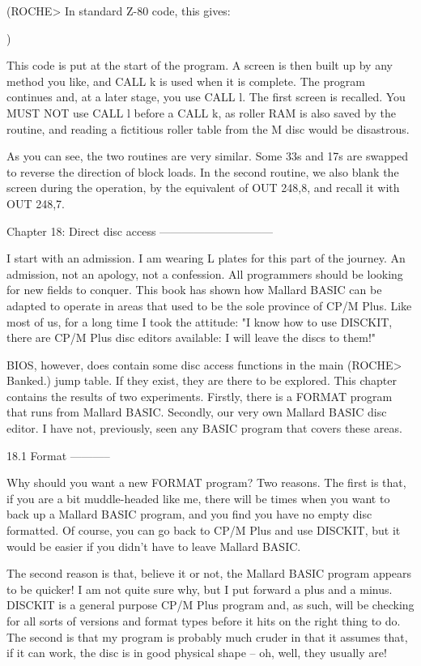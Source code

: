 (ROCHE> In standard Z-80 code, this gives:

$$$$
)

This code is put at the start of the program. A screen is then built up by any 
method you like, and CALL k is used when it is complete. The program continues 
and, at a later stage, you use CALL l. The first screen is recalled. You  MUST 
NOT  use CALL l before a CALL k, as roller RAM is also saved by  the  routine, 
and reading a fictitious roller table from the M disc would be disastrous.

As  you  can  see, the two routines are very similar. Some  33s  and  17s  are 
swapped  to  reverse the direction of block loads. In the second  routine,  we 
also  blank the screen during the operation, by the equivalent of  OUT  248,8, 
and recall it with OUT 248,7.


Chapter 18: Direct disc access
------------------------------

I start with an admission. I am wearing L plates for this part of the journey. 
An  admission,  not an apology, not a confession. All  programmers  should  be 
looking  for new fields to conquer. This book has shown how Mallard BASIC  can 
be adapted to operate in areas that used to be the sole province of CP/M Plus. 
Like  most  of  us, for a long time I took the attitude: "I know  how  to  use 
DISCKIT, there are CP/M Plus disc editors available: I will leave the discs to 
them!"

BIOS,  however,  does contain some disc access functions in the  main  (ROCHE> 
Banked.)  jump  table.  If they exist, they are there  to  be  explored.  This 
chapter  contains the results of two experiments. Firstly, there is  a  FORMAT 
program  that  runs from Mallard BASIC. Secondly, our very own  Mallard  BASIC 
disc editor. I have not, previously, seen any BASIC program that covers  these 
areas.


18.1 Format
-----------

Why  should you want a new FORMAT program? Two reasons. The first is that,  if 
you are a bit muddle-headed like me, there will be times when you want to back 
up a Mallard BASIC program, and you find you have no empty disc formatted.  Of 
course,  you can go back to CP/M Plus and use DISCKIT, but it would be  easier 
if you didn't have to leave Mallard BASIC.

The  second  reason  is that, believe it or not,  the  Mallard  BASIC  program 
appears to be quicker! I am not quite sure why, but I put forward a plus and a 
minus.  DISCKIT is a general purpose CP/M Plus program and, as such,  will  be 
checking  for  all sorts of versions and format types before it  hits  on  the 
right  thing to do. The second is that my program is probably much  cruder  in 
that  it assumes that, if it can work, the disc is in good physical  shape  -- 
oh, well, they usually are!

